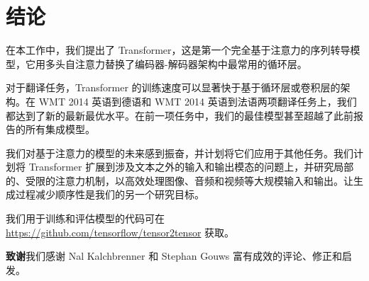 \documentclass[11pt,UTF8,fontset=fandol]{ctexart}
\begin{document}
\section{结论}

在本工作中，我们提出了 Transformer，这是第一个完全基于注意力的序列转导模型，它用多头自注意力替换了编码器-解码器架构中最常用的循环层。

对于翻译任务，Transformer 的训练速度可以显著快于基于循环层或卷积层的架构。在 WMT 2014 英语到德语和 WMT 2014 英语到法语两项翻译任务上，我们都达到了新的最新最优水平。在前一项任务中，我们的最佳模型甚至超越了此前报告的所有集成模型。

我们对基于注意力的模型的未来感到振奋，并计划将它们应用于其他任务。我们计划将 Transformer 扩展到涉及文本之外的输入和输出模态的问题上，并研究局部的、受限的注意力机制，以高效处理图像、音频和视频等大规模输入和输出。让生成过程减少顺序性是我们的另一个研究目标。

我们用于训练和评估模型的代码可在 \url{https://github.com/tensorflow/tensor2tensor} 获取。

\vspace{0.5em}
\noindent\textbf{致谢}\quad 我们感谢 Nal Kalchbrenner 和 Stephan Gouws 富有成效的评论、修正和启发。
\end{document}
